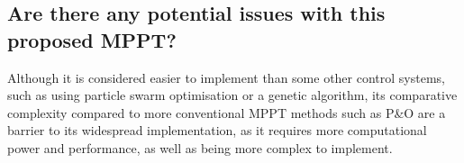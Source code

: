 \documentclass[]{article}
\begin{document}
		\subsection{Are there any potential issues with this proposed MPPT?}
			Although it is considered easier to implement than some other control systems, such as using particle swarm optimisation or a genetic algorithm, its comparative complexity compared to more conventional MPPT methods such as P\&O are a barrier to its widespread implementation, as it requires more computational power and performance, as well as being more complex to implement.
	\newpage
	\printbibliography
\end{document}
